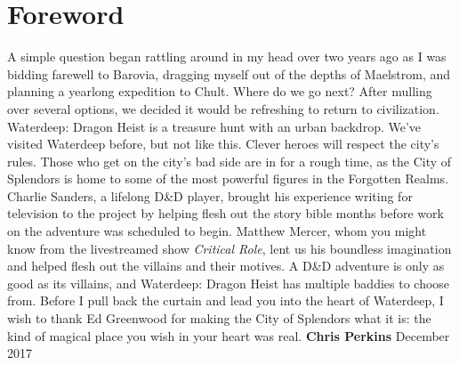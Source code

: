 \documentclass[10pt,a4paper,twoside,twocolumn,openany,nodeprecatedcode]{dndbook}
\begin{document}
\raggedbottom
\tableofcontents
\newpage
\chapter{Foreword}
A simple question began rattling around in my head over two years ago as I was bidding farewell to Barovia, dragging myself out of the depths of Maelstrom, and planning a yearlong expedition to Chult. Where do we go next? After mulling over several options, we decided it would be refreshing to return to civilization. Waterdeep: Dragon Heist is a treasure hunt with an urban backdrop. We've visited Waterdeep before, but not like this. Clever heroes will respect the city's rules. Those who get on the city's bad side are in for a rough time, as the City of Splendors is home to some of the most powerful figures in the Forgotten Realms.
Charlie Sanders, a lifelong D\&D player, brought his experience writing for television to the project by helping flesh out the story bible months before work on the adventure was scheduled to begin. Matthew Mercer, whom you might know from the livestreamed show \textit{Critical Role}, lent us his boundless imagination and helped flesh out the villains and their motives. A D\&D adventure is only as good as its villains, and Waterdeep: Dragon Heist has multiple baddies to choose from.
Before I pull back the curtain and lead you into the heart of Waterdeep, I wish to thank Ed Greenwood for making the City of Splendors what it is: the kind of magical place you wish in your heart was real.
\textbf{Chris Perkins} December 2017
\end{document}
